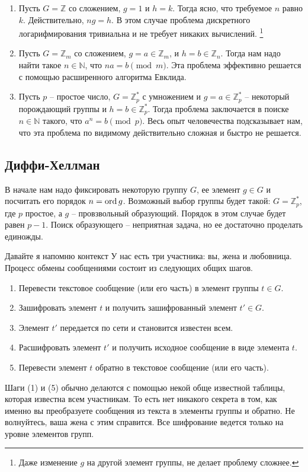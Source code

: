\begin{examples}
\begin{enumerate}
\item Пусть $G = \mathbb Z$ со сложением, $g = 1$ и $h = k$. Тогда ясно, что требуемое $n$ равно $k$. Действительно, $ng = h$. В этом случае проблема дискретного логарифмирования тривиальна и не требует никаких вычислений.%
\footnote{Даже изменение $g$ на другой элемент группы, не делает проблему сложнее.}

\item Пусть $G = \mathbb Z_m$ со сложением, $g = a\in \mathbb Z_m$, и $h = b\in \mathbb Z_n$. Тогда нам надо найти такое $n\in\mathbb N$, что $na = b \pmod m$. Эта проблема эффективно решается с помощью расширенного алгоритма Евклида.

\item Пусть $p$ -- простое число, $G = \mathbb Z_p^*$ с умножением и $g = a\in \mathbb Z_p^*$ -- некоторый порождающий группы и $h = b\in \mathbb Z_p^*$. Тогда проблема заключается в поиске $n\in \mathbb N$ такого, что $a^n = b \pmod p$. Весь опыт человечества подсказывает нам, что эта проблема по видимому действительно сложная и быстро не решается.
\end{enumerate}
\end{examples}

\subsection{Диффи-Хеллман}

В начале нам надо фиксировать некоторую группу $G$, ее элемент $g\in G$ и посчитать его порядок $n = \operatorname{ord} g$.
Возможный выбор группы будет такой: $G = \mathbb Z_p^*$, где $p$ простое, а $g$ -- провзвольный образующий. Порядок в этом случае будет равен $p - 1$. Поиск образующего -- неприятная задача, но ее достаточно проделать единожды.

Давайте я напомню контекст
У нас есть три участника: вы, жена и любовница.
Процесс обмены сообщениями состоит из следующих общих шагов.
\begin{enumerate}
\item Перевести текстовое сообщение (или его часть) в элемент группы $t\in G$.

\item Зашифровать элемент $t$ и получить зашифрованный элемент $t'\in G$.

\item Элемент $t'$ передается по сети и становится известен всем.

\item Расшифровать элемент $t'$ и получить исходное сообщение в виде элемента $t$.

\item Перевести элемент $t$ обратно в текстовое сообщение (или его часть).
\end{enumerate}
Шаги (1) и (5) обычно делаются с помощью некой обще известной таблицы, которая известна всем участникам. То есть нет никакого секрета в том, как именно вы преобразуете сообщения из текста в элементы группы и обратно. Не волнуйтесь, ваша жена с этим справится. Все шифрование ведется только на уровне элементов групп.

